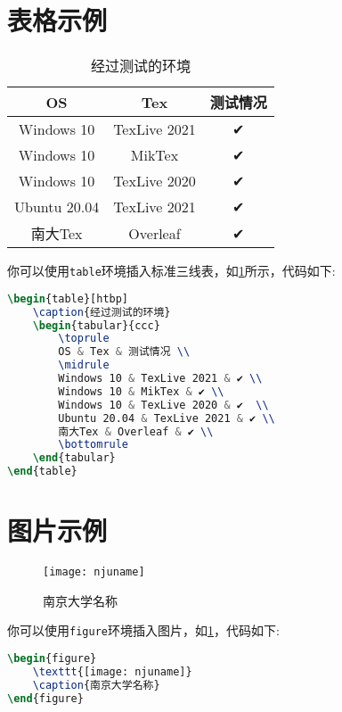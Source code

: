 \documentclass[
    TitleLength=1,%
    Degree=UG,%
    Type=thesis%
]{njuthesis}
\begin{document}
\section{表格示例}
\begin{table}[htbp]
    \caption{经过测试的环境}
    \label{tab:mytab}
    \begin{tabular}{ccc}
        \toprule
        OS & Tex & 测试情况 \\
        \midrule
        Windows 10 & TexLive 2021 & ✔ \\
        Windows 10 & MikTex & ✔ \\
        Windows 10 & TexLive 2020 & ✔  \\
        Ubuntu 20.04 & TexLive 2021 & ✔ \\
        南大Tex & Overleaf & ✔ \\
        \bottomrule
    \end{tabular}
\end{table}
你可以使用\lstinline|table|环境插入标准三线表，如\cref{tab:mytab}所示，代码如下:
\begin{lstlisting}[language=TeX]
\begin{table}[htbp]
    \caption{经过测试的环境}
    \begin{tabular}{ccc}
        \toprule
        OS & Tex & 测试情况 \\
        \midrule
        Windows 10 & TexLive 2021 & ✔ \\
        Windows 10 & MikTex & ✔ \\
        Windows 10 & TexLive 2020 & ✔  \\
        Ubuntu 20.04 & TexLive 2021 & ✔ \\
        南大Tex & Overleaf & ✔ \\
        \bottomrule
    \end{tabular}
\end{table}
\end{lstlisting}

\section{图片示例}
\label{sec:figures}
\begin{figure}[htbp]
    \texttt{[image: njuname]}
    \caption{南京大学名称}
    \label{fig:njuname}
\end{figure}
你可以使用\lstinline|figure|环境插入图片，如\cref{fig:njuname}，代码如下:
\begin{lstlisting}[language=TeX]
\begin{figure}
    \texttt{[image: njuname]}
    \caption{南京大学名称}
\end{figure}
\end{lstlisting}
\end{document}
